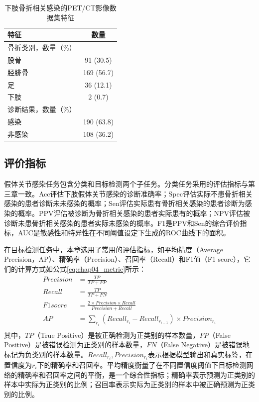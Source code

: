 \begin{table}[htbp]
  \centering
  \caption{下肢骨折相关感染的PET/CT影像数据集特征}
  \begin{tabular}{lc}
    \toprule
    特征         & 数量       \\
    \midrule
    骨折类别，数量（\%）      \\
    \quad 股骨   & 91 (30.5)  \\
    \quad 胫腓骨 & 169 (56.7) \\
    \quad 足     & 36 (12.1)  \\
    \quad 下肢   & 2 (0.7)    \\
    诊断结果，数量（\%）      \\
    \quad 感染   & 190 (63.8) \\
    \quad 非感染 & 108 (36.2) \\
    \bottomrule
  \end{tabular}
  \label{tab:chap04_dataset}
\end{table}

\subsection{评价指标}

假体关节感染任务包含分类和目标检测两个子任务。分类任务采用的评估指标与第三章一致。Acc评估下肢假体关节感染的诊断准确率；Spec评估实际不患骨折相关感染的患者诊断未未感染的概率；Sen评估实际患有骨折相关感染的患者诊断为感染的概率。PPV评估被诊断为骨折相关感染的患者实际患有的概率；NPV评估被诊断未患骨折相关感染的患者实际未感染的概率。F1是PPV和Sen的综合评价指标，AUC是敏感性和特异性在不同阈值设定下生成的ROC曲线下的面积。

在目标检测任务中，本章选用了常用的评估指标，如平均精度（Average Precision，AP）、精确率（Precision）、召回率（Recall）和F1值（F1 score），它们的计算方式如公式\ref{eq:chap04_metric}所示：
\begin{equation}
  \begin{aligned}
    Precision & = \frac{TP}{TP+FP}                                                   \\
    Recall    & = \frac{TP}{TP+FN}                                                   \\
    F1 socre  & = \frac{2 \times Precision \times Recall}{Precision + Recall}        \\
    AP        & = \sum_{r_i}(Recall_{r_i} - Recall_{r_{i-1}}) \times Precision_{r_i} \\
  \end{aligned}
  \label{eq:chap04_metric}
\end{equation}
其中，\(TP\)（True Positive）是被正确检测为正类别的样本数量，\(FP\)（False Positive）是被错误检测为正类别的样本数量，\(FN\)（False Negative）是被错误地标记为负类别的样本数量。\(Recall_{r_i}, Precision_{r_i}\)表示根据模型输出和真实标签，在置信度为\(r_i\)下的精确率和召回率。平均精度衡量了在不同置信度阈值下目标检测网络的精确率和召回率之间的平衡，是一个综合性指标；精确率表示预测为正类别的样本中实际为正类别的比例；召回率表示实际为正类别的样本中被正确预测为正类别的比例。

